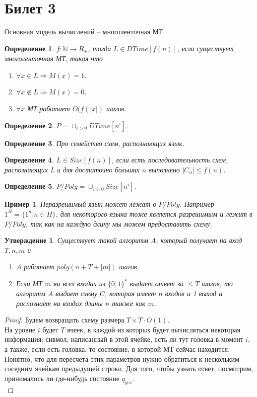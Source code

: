\documentclass[12pt, letterpaper]{article}
\newtheorem{prop}{Утверждение}[section]
\newtheorem{defi}{Определение}[section]
\newtheorem{sample}{Пример}[section]
\begin{document}
\section{Билет 3}
Основная модель вычислений -- многоленточная МТ. 
\begin{defi}
$f : \mathbb{N} \rightarrow R_{+}$, тогда $L \in DTime[f(n)]$, если 
существует многоленточная МТ, такая что
\begin{enumerate}
\item $\forall x \in L \Rightarrow M(x) = 1$.
\item $\forall x \notin L \Rightarrow M(x) = 0$.
\item $\forall x$ МТ работает $O(f(|x|)$ шагов.
\end{enumerate} 
\end{defi} 

\begin{defi}
$P = \cup_{i>0} DTime[n^i]$.
\end{defi}

\begin{defi}
Про семейство схем, распознающих язык.
\end{defi}

\begin{defi}
$L \in Size[f(n)]$, если есть последовательность схем, распознающих L и для достаточно больших $n$ выполнено $|C_n| \leq f(n)$.
\end{defi}

\begin{defi}
$P/Poly = \cup_{i>0} Size[n^i]$.
\end{defi}

\begin{sample}
Неразрешимый язык может лежат в $P/Poly$. Например $1^{H}=\{1^{n} | n \in H \}$, для некоторого языка тоже является разрешимым и лежит в $P/Poly$, так как на каждую длину мы можем предоставить схему.  
\end{sample}

\begin{prop}
Существует такой алгоритм $A$, который получает на вход $T,n,m$ и 
\begin{enumerate}
\item $A$ работает $poly(n + T + |m|)$ шагов.
\item Если МТ $m$ на всех входах из $\{0,1\}^{*}$ выдает ответ за $\leq T$ шагов, то алгоритм $A$ выдает схему $C$, которая имеет $n$ входов и 1 выход и распознает на входах длины $n$ также как $m$.
\end{enumerate}
\end{prop}
\begin{proof}
Будем возвращать схему размера $T \times T \cdot O(1)$.\\
На уровне $i$ будет $T$ ячеек, в каждой из которых будет вычисляться некоторая информация: сивмол, написанный в этой ячейке, есть ли тут головка в момент $i$, а также, если есть головка, то состояние, в которой МТ сейчас находится. Понятно, что для пересчета этих параметров нужно обратиться к нескольким соседним ячейкам предыдущей строки. Для того, чтобы узнать ответ, посмотрим, принималось ли где-нибудь состояние $q_{yes}$.\\
\end{proof}
\end{document}

